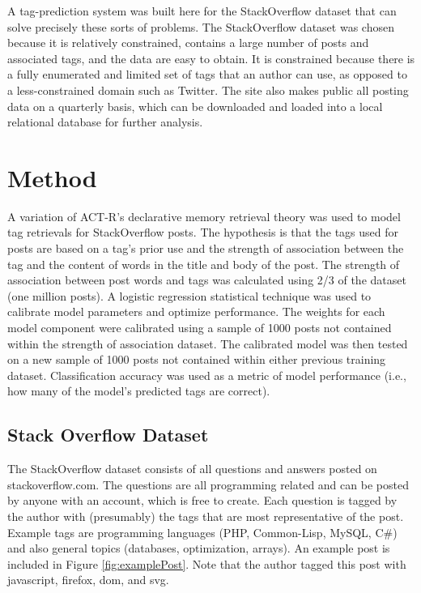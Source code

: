 \documentclass[10pt,letterpaper]{article}
\begin{document}
A tag-prediction system was built here for the StackOverflow dataset that can solve precisely these sorts of problems.
The StackOverflow dataset was chosen because it is relatively constrained, contains a large number of posts and associated tags, and the data are easy to obtain.
It is constrained because there is a fully enumerated and limited set of tags that an author can use, as opposed to a less-constrained domain such as Twitter.
The site also makes public all posting data on a quarterly basis, which can be downloaded and loaded into a local relational database for further analysis.

\section{Method}

A variation of ACT-R's declarative memory retrieval theory \cite{Anderson2004} was used to model tag retrievals for StackOverflow posts.
The hypothesis is that the tags used for posts are based on a tag's prior use and the strength of association between the tag and the content of words in the title and body of the post.
The strength of association between post words and tags was calculated using 2/3 of the dataset (one million posts).
A logistic regression statistical technique was used to calibrate model parameters and optimize performance.
The weights for each model component were calibrated using a sample of \num{1000} posts not contained within the strength of association dataset.
The calibrated model was then tested on a new sample of \num{1000} posts not contained within either previous training dataset.
Classification accuracy was used as a metric of model performance (i.e., how many of the model's predicted tags are correct).

\subsection{Stack Overflow Dataset}

The StackOverflow dataset consists of all questions and answers posted on stackoverflow.com.
The questions are all programming related and can be posted by anyone with an account, which is free to create.
Each question is tagged by the author with (presumably) the tags that are most representative of the post.
Example tags are programming languages (PHP, Common-Lisp, MySQL, C\#) and also general topics (databases, optimization, arrays).
An example post is included in Figure \ref{fig:examplePost}.
Note that the author tagged this post with javascript, firefox, dom, and svg.
\end{document}
